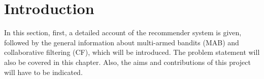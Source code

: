 \documentclass[12pt,two side ]{report}
\begin{document}



% 
\tableofcontents

\chapter{Introduction}
In this section, first, a detailed account of the recommender system is given, followed by the general information about multi-armed bandits (MAB) and collaborative filtering (CF), which will be introduced. The problem statement will also be covered in this chapter. Also, the aims and contributions of this project will have to be indicated.





%




\printbibliography
{}
\end{document}
